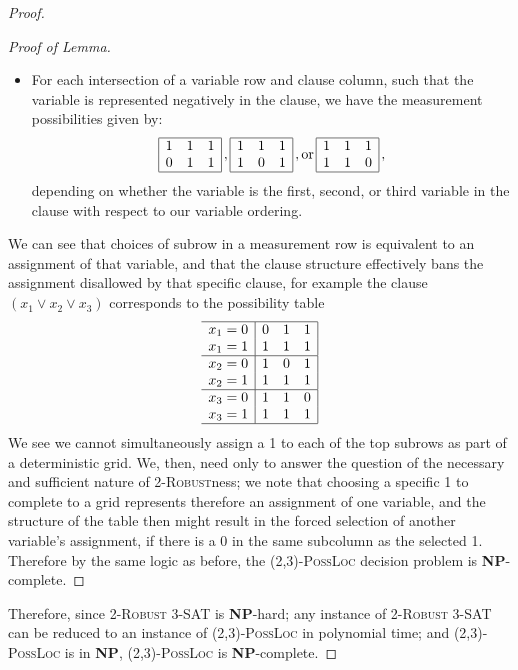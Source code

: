 \documentclass[reprint]{revtex4-1}
\theoremstyle{definition}
\begin{document}
\begin{proof}
\begin{proof}[Proof of Lemma]
\begin{itemize}
\item For each intersection of a variable row and clause column, such that the variable is represented negatively in the clause, we have the measurement possibilities given by:
\begin{equation}
\begin{array}{  | c c  c|}
\hline
 1 & 1 & 1 \\
 0 & 1& 1 \\ \hline
 \end{array}\, ,
 \begin{array}{  | c c  c|}
\hline
 1 &1 & 1 \\
 1 & 0& 1 \\ \hline
 \end{array} \, ,
 \mbox{or} \,
 \begin{array}{  | c c  c|}
\hline
 1 & 1 & 1\\
 1 & 1& 0 \\ \hline
 \end{array}\, ,
 \end{equation}
depending on whether the variable is the first, second, or third variable in the clause with respect to our variable ordering.
\end{itemize}
We can see that choices of subrow in a measurement row is equivalent to an assignment of that variable, and that the clause structure effectively bans the assignment disallowed by that specific clause, for example the clause $(x_1 \vee x_2 \vee x_3)$ corresponds to the possibility table
\begin{equation*}
\begin{array}{c  | c c  c|}
\hline
 x_1=0&0 & 1 & 1 \\
 x_1=1&1 & 1& 1 \\ \hline
 x_2=0&1 &0 & 1 \\
x_2=1& 1 & 1& 1 \\ \hline
x_3=0& 1 & 1 & 0\\
x_3=1& 1 & 1& 1 \\ \hline
 \end{array}
 \end{equation*}
We see we cannot simultaneously assign a 1 to each of the top subrows as part of a deterministic grid. We, then, need only to answer the question of the necessary and sufficient nature of \textsc{2-Robust}ness; we note that choosing a specific 1 to complete to a grid represents therefore an assignment of one variable, and the structure of the table then might result in the forced selection of another variable's assignment, if there is a 0 in the same subcolumn as the selected 1. Therefore by the same logic as before, the \textsc{(2,3)-PossLoc} decision problem is \textbf{NP}-complete.
\end{proof}
Therefore, since \textsc{2-Robust 3-SAT} is \textbf{NP}-hard; any instance of \textsc{2-Robust 3-SAT} can be reduced to an instance of \textsc{(2,3)-PossLoc} in polynomial time; and \textsc{(2,3)-PossLoc} is in \textbf{NP}, \textsc{(2,3)-PossLoc} is \textbf{NP}-complete.
\end{proof}
\end{document}
